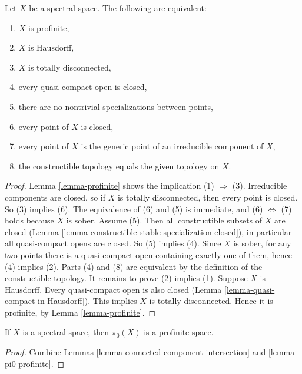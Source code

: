 \begin{lemma}
\label{lemma-characterize-profinite-spectral}
Let $X$ be a spectral space. The following are equivalent:
\begin{enumerate}
\item $X$ is profinite,
\item $X$ is Hausdorff,
\item $X$ is totally disconnected,
\item every quasi-compact open is closed,
\item there are no nontrivial specializations between points,
\item every point of $X$ is closed,
\item every point of $X$ is the generic point of an irreducible component
of $X$,
\item the constructible topology equals the given topology on $X$.
\end{enumerate}
\end{lemma}

\begin{proof}
Lemma \ref{lemma-profinite} shows the implication (1) $\Rightarrow$ (3).
Irreducible components are closed, so if $X$ is totally disconnected, then
every point is closed. So (3) implies (6). The equivalence of (6) and (5)
is immediate, and (6) $\Leftrightarrow$ (7) holds because $X$ is sober.
Assume (5). Then all constructible subsets of $X$ are closed
(Lemma \ref{lemma-constructible-stable-specialization-closed}), in
particular all quasi-compact opens are closed. So (5) implies (4).
Since $X$ is sober, for any two points there is a quasi-compact open
containing exactly one of them, hence (4) implies (2).
Parts (4) and (8) are equivalent by the definition of the
constructible topology.
It remains to prove (2) implies (1). Suppose $X$ is Hausdorff. Every
quasi-compact open is also closed
(Lemma \ref{lemma-quasi-compact-in-Hausdorff}). This implies $X$
is totally disconnected. Hence it is profinite, by
Lemma \ref{lemma-profinite}.
\end{proof}

\begin{lemma}
\label{lemma-spectral-pi0}
If $X$ is a spectral space, then $\pi_0(X)$ is a profinite space.
\end{lemma}

\begin{proof}
Combine Lemmas \ref{lemma-connected-component-intersection} and
\ref{lemma-pi0-profinite}.
\end{proof}

